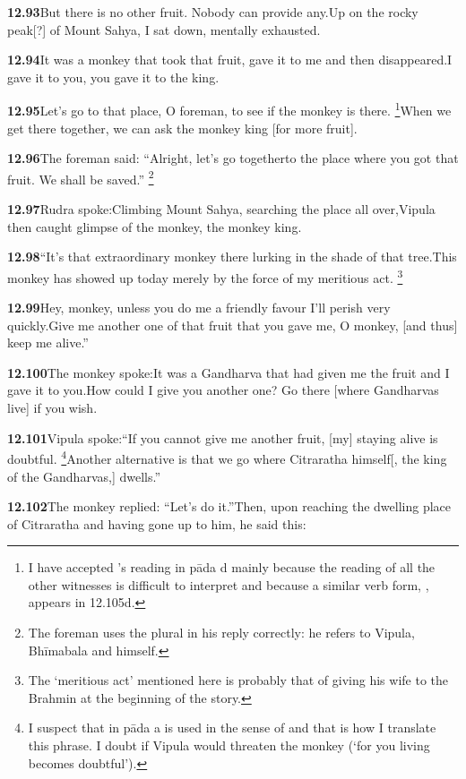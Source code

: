 \textbf{12.93}But there is no other fruit. Nobody can provide any.Up on the rocky peak[?] of Mount Sahya, I sat down, mentally exhausted.%


\textbf{12.94}It was a monkey that took that fruit, gave it to me                        and then disappeared.I gave it to you, you gave it to the king.%


\textbf{12.95}Let's go to that place, O foreman, to see if the monkey is there.%
\footnote{I have accepted \msCb's reading in pāda d mainly because the reading               of all the other witnesses is difficult to interpret and because               a similar verb form, , appears in 12.105d.  }When we get there together, we can ask the monkey king [for more fruit].%


\textbf{12.96}The foreman said: ``Alright, let's go togetherto the place where you got that fruit. We shall be saved.''%
\footnote{The foreman uses the plural in his reply correctly: he refers to               Vipula, Bhīmabala and himself.  }%


\textbf{12.97}Rudra spoke:Climbing Mount Sahya, searching the place all over,Vipula then caught glimpse of the monkey, the monkey king.%


\textbf{12.98}``It's that extraordinary monkey there lurking in the shade of that tree.This monkey has showed up today merely by the force of my meritious act.%
\footnote{The `meritious act' mentioned here is probably that of giving his wife to                  the Brahmin at the beginning of the story.  }%


\textbf{12.99}Hey, monkey, unless you do me a friendly favour I'll perish very quickly.Give me another one of that fruit that you gave me, O monkey, [and thus] keep me alive.''%


\textbf{12.100}The monkey spoke:It was a Gandharva that had given me the fruit and I gave it to you.How could I give you another one? Go there [where Gandharvas live] if you wish.%


\textbf{12.101}Vipula spoke:``If you cannot give me another fruit, [my] staying alive is doubtful.%
\footnote{I suspect that  in pāda a is used in the sense of  and                 that is how I translate this phrase. I doubt if Vipula would                 threaten the monkey (`for you living becomes doubtful').  }Another alternative is that we go where Citraratha himself[, the king of                the Gandharvas,] dwells.''%


\textbf{12.102}The monkey replied: ``Let's do it.''Then, upon reaching the dwelling place of Citraratha and having gone up to him, he said this:%


